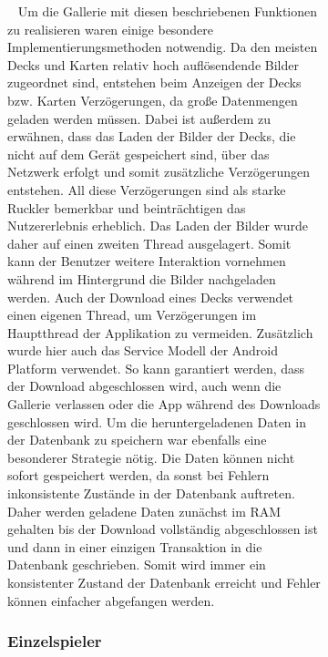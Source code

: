\documentclass{scrartcl}
\begin{document}
\begin{figure}[!ht]
\begin{figure}[!ht]
\ \newline
Um die Gallerie mit diesen beschriebenen Funktionen zu
realisieren waren einige besondere Implementierungsmethoden notwendig. Da den
meisten Decks und Karten relativ hoch auflösendende Bilder zugeordnet sind,
entstehen beim Anzeigen der Decks bzw. Karten Verzögerungen, da große
Datenmengen geladen werden müssen. Dabei ist außerdem zu erwähnen, dass das
Laden der Bilder der Decks, die nicht auf dem Gerät gespeichert sind, über das
Netzwerk erfolgt und somit zusätzliche Verzögerungen entstehen. All diese
Verzögerungen sind als starke Ruckler bemerkbar und beinträchtigen das
Nutzererlebnis erheblich. Das Laden der Bilder wurde daher auf einen zweiten
Thread ausgelagert. Somit kann der Benutzer weitere Interaktion vornehmen
während im Hintergrund die Bilder nachgeladen werden. Auch der Download eines
Decks verwendet einen eigenen Thread, um Verzögerungen im Hauptthread der
Applikation zu vermeiden. Zusätzlich wurde hier auch das Service Modell der
Android Platform verwendet. So kann garantiert werden, dass der Download
abgeschlossen wird, auch wenn die Gallerie verlassen oder die App während des
Downloads geschlossen wird. Um die heruntergeladenen Daten in der Datenbank zu
speichern war ebenfalls eine besonderer Strategie nötig. Die Daten können nicht
sofort gespeichert werden, da sonst bei Fehlern inkonsistente Zustände in der
Datenbank auftreten. Daher werden geladene Daten zunächst im RAM gehalten
bis der Download vollständig abgeschlossen ist und dann in einer einzigen
Transaktion in die Datenbank geschrieben. Somit wird immer ein konsistenter
Zustand der Datenbank erreicht und Fehler können einfacher abgefangen werden.

\subsubsection{Einzelspieler}


\end{figure}
\end{figure}
\end{document}
